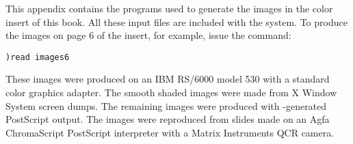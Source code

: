 
%
%
%
%
%

%
This appendix contains the \Language{} programs used to generate
the images in the \Gallery{} color insert of this book.
All these input files are included
with the \Language{} system.
To produce the images
on page 6 of the \Gallery{} insert, for example, issue the command:
\begin{verbatim}
)read images6
\end{verbatim}

These images were produced on an IBM RS/6000 model 530 with a
standard color graphics adapter.  The smooth shaded images
were made from X Window System screen dumps.
The remaining images were produced with \Language{}-generated
PostScript output.  The images were reproduced from slides made on an Agfa
ChromaScript PostScript interpreter with a Matrix Instruments QCR camera.

